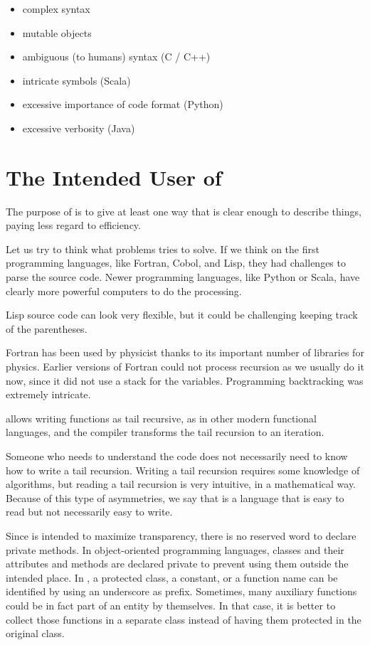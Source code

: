 \begin{itemize}
    \item complex syntax
    \item mutable objects
    \item ambiguous (to humans) syntax (C / C++)
    \item intricate symbols (Scala)
    \item excessive importance of code format (Python)
    \item excessive verbosity (Java)
\end{itemize}


\section{The Intended User of \Soda}

The purpose of \Soda is to give at least one way that is clear enough to describe things, paying less regard to efficiency.

Let us try to think what problems \Soda tries to solve.
If we think on the first programming languages, like Fortran, Cobol, and Lisp, they had challenges to parse the source code.
Newer programming languages, like Python or Scala, have clearly more powerful computers to do the processing.

Lisp source code can look very flexible, but it could be challenging keeping track of the parentheses.

Fortran has been used by physicist thanks to its important number of libraries for physics.
Earlier versions of Fortran could not process recursion as we usually do it now, since it did not use a stack for the variables.
Programming backtracking was extremely intricate.

\Soda allows writing functions as tail recursive, as in other modern functional languages, and the compiler transforms the tail recursion to an iteration.

Someone who needs to understand the code does not necessarily need to know how to write a tail recursion.
Writing a tail recursion requires some knowledge of algorithms, but reading a tail recursion is very intuitive, in a mathematical way.
Because of this type of asymmetries, we say that \Soda is a language that is easy to read but not necessarily easy to write.

Since \Soda is intended to maximize transparency, there is no reserved word to declare private methods.
In object-oriented programming languages, classes and their attributes and methods are declared private to prevent using them outside the intended place.
In \Soda, a protected class, a constant, or a function name can be identified by using an underscore as prefix.
Sometimes, many auxiliary functions could be in fact part of an entity by themselves.
In that case, it is better to collect those functions in a separate class instead of having them protected in the original class.


